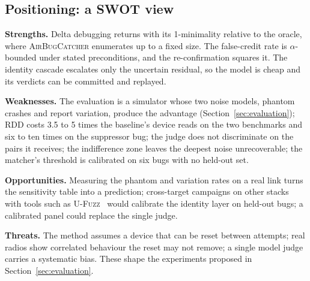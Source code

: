 \subsection{Positioning: a SWOT view}

\textbf{Strengths.} Delta debugging returns with its 1-minimality relative to the
oracle, where \textsc{AirBugCatcher} enumerates up to a fixed size. The false-credit
rate is $\alpha$-bounded under stated preconditions, and the re-confirmation
squares it. The identity cascade escalates only the uncertain residual, so the
model is cheap and its verdicts can be committed and replayed.

\textbf{Weaknesses.} The evaluation is a simulator whose two noise models,
phantom crashes and report variation, produce the advantage
(Section~\ref{sec:evaluation}); RDD costs 3.5 to 5 times the baseline's device reads on the two
benchmarks and six to ten times on the suppressor bug; the judge does not discriminate on the pairs it receives; the
indifference zone leaves the deepest noise unrecoverable; the matcher's threshold
is calibrated on six bugs with no held-out set.

\textbf{Opportunities.} Measuring the phantom and variation rates on a real link
turns the sensitivity table into a prediction; cross-target campaigns on other
stacks with tools such as \textsc{U-Fuzz}~\cite{ufuzz2024} would calibrate the
identity layer on held-out bugs; a calibrated panel could replace the single judge.

\textbf{Threats.} The method assumes a device that can be reset between attempts;
real radios show correlated behaviour the reset may not remove; a single model
judge carries a systematic bias. These shape the experiments proposed in
Section~\ref{sec:evaluation}.
